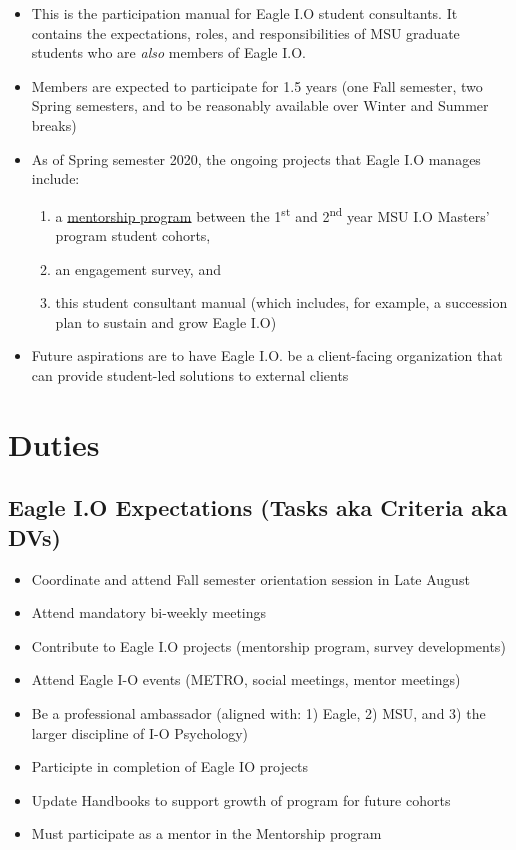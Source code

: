\documentclass[
]{book}
\providecommand{\tightlist}{%
  \setlength{\itemsep}{0pt}\setlength{\parskip}{0pt}}
\begin{document}
\begin{itemize}
\tightlist
\item
  This is the participation manual for Eagle I.O student consultants. It contains the expectations, roles, and responsibilities of MSU graduate students who are \emph{also} members of Eagle I.O.
\item
  Members are expected to participate for 1.5 years (one Fall semester, two Spring semesters, and to be reasonably available over Winter and Summer breaks)
\item
  As of Spring semester 2020, the ongoing projects that Eagle I.O manages include:

  \begin{enumerate}
  \def\labelenumi{\arabic{enumi})}
  \tightlist
  \item
    a \href{https://bookdown.org/kulasj/mentoruser/}{mentorship program} between the 1\textsuperscript{st} and 2\textsuperscript{nd} year MSU I.O Masters' program student cohorts,
  \item
    an engagement survey, and
  \item
    this student consultant manual (which includes, for example, a succession plan to sustain and grow Eagle I.O)
  \end{enumerate}
\item
  Future aspirations are to have Eagle I.O. be a client-facing organization that can provide student-led solutions to external clients
\end{itemize}

\hypertarget{duties}{%
\chapter{Duties}\label{duties}}

\hypertarget{eagle-i.o-expectations-tasks-aka-criteria-aka-dvs}{%
\section{Eagle I.O Expectations (Tasks aka Criteria aka DVs)}\label{eagle-i.o-expectations-tasks-aka-criteria-aka-dvs}}

\begin{itemize}
\tightlist
\item
  Coordinate and attend Fall semester orientation session in Late August
\item
  Attend mandatory bi-weekly meetings
\item
  Contribute to Eagle I.O projects (mentorship program, survey developments)
\item
  Attend Eagle I-O events (METRO, social meetings, mentor meetings)
\item
  Be a professional ambassador (aligned with: 1) Eagle, 2) MSU, and 3) the larger discipline of I-O Psychology)
\item
  Participte in completion of Eagle IO projects
\item
  Update Handbooks to support growth of program for future cohorts
\item
  Must participate as a mentor in the Mentorship program
\end{itemize}
\end{document}
